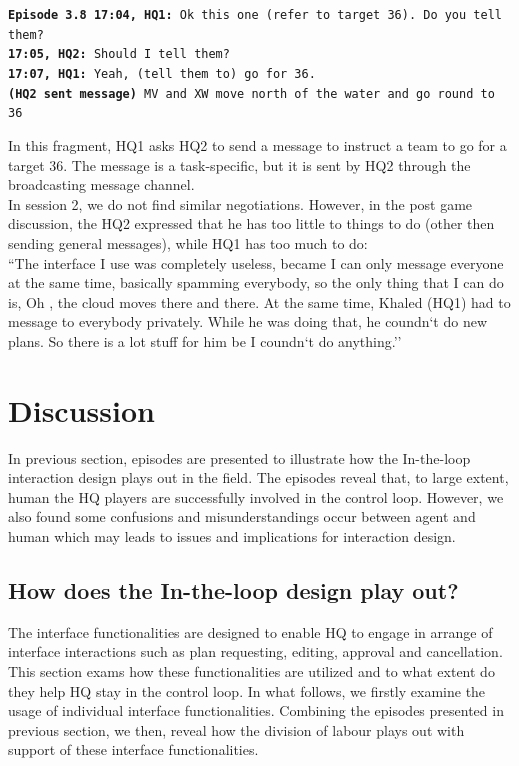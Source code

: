 \noindent\texttt{\textbf{Episode 3.8 }
\textbf{17:04, HQ1: } Ok this one (refer to target 36). Do you tell them? \\
\textbf{17:05, HQ2: } Should I tell them? \\
\textbf{17:07, HQ1: } Yeah, (tell them to) go for 36. \\
\textbf{(HQ2 sent message) } MV and XW  move north of the water and go round to 36\\
}

In this fragment, HQ1 asks HQ2 to send a message to instruct a team to go for a target 36. The message is a task-specific, but it is sent by HQ2 through the broadcasting message channel.\\

In session 2, we do not find similar negotiations. However, in the post game discussion, the HQ2 expressed that he has too little to things to do (other then sending general messages), while HQ1 has too much to do:\\

``The interface I use was completely useless, became I can only message everyone at the same time, basically spamming everybody, so the only thing that I can do is, Oh , the cloud moves there and there. At the same time, Khaled (HQ1) had to message to everybody privately. While he was doing that, he coundn`t do new plans. So there is a lot stuff for him be I coundn`t do anything.''\\

\section{Discussion}\label{sec:study3discussion}

In previous section, episodes are presented to illustrate how the In-the-loop interaction design plays out in the field.  The episodes reveal that, to large extent, human the HQ players are successfully involved in the control loop. However, we also found some confusions and misunderstandings occur between agent and human which may leads to issues and implications for interaction design.  \\

\subsection{How does the In-the-loop design play out?}
The interface functionalities are designed to enable HQ to engage in arrange of interface interactions such as plan requesting, editing, approval and cancellation. This section exams how these functionalities are utilized and to what extent do they help HQ stay in the control loop. In what follows, we firstly examine the usage of individual interface functionalities. Combining the episodes presented in previous section, we then, reveal how the division of labour plays out with support of these interface functionalities.  \\

